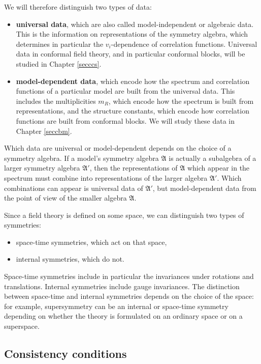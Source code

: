 \documentclass[12pt, a4paper, notitlepage, twoside]{report}
\numberwithin{equation}{section}
\theoremstyle{break}
\begin{document}
We will therefore distinguish two types of data:
\begin{itemize}
 \item \textbf{\boldmath universal data}, which are also called 
model-independent or algebraic data.
This is the information on representations of the symmetry algebra, which determines in particular the $v_i$-dependence of correlation functions.
Universal data in conformal field theory, and in particular conformal blocks, will be studied in Chapter \ref{secccs}. 
\item \textbf{\boldmath model-dependent data}, which encode how the spectrum and correlation functions of a particular model are built from the universal data.
This includes the multiplicities $m_R$, which encode how the spectrum is built from representations, and the structure constants, which encode how correlation functions are built from conformal blocks.
We will study these data 
in Chapter \ref{seccbm}.  
\end{itemize}
Which data are  universal or model-dependent depends on the choice of a symmetry algebra.
If a model's symmetry algebra $\mathfrak{A}$ is actually a subalgebra of a larger symmetry algebra $\mathfrak{A}'$, then the representations of $\mathfrak{A}$ which appear in the spectrum
must combine into representations of the larger algebra $\mathfrak{A}'$.
Which combinations can appear is universal data of $\mathfrak{A}'$, but model-dependent data from the point of view of the smaller algebra $\mathfrak{A}$. 

Since a field theory is defined on some space, we can distinguish two types of symmetries: 
\begin{itemize}
 \item space-time symmetries, which act on that space,
\item internal symmetries, which do not.
\end{itemize}
Space-time symmetries include in particular the invariances under rotations and translations.
Internal symmetries include gauge invariances.
The distinction between space-time and internal symmetries depends on the choice of the space: for example, supersymmetry can be an internal or space-time symmetry depending on whether the theory is formulated on an ordinary space or on a superspace.

\subsection{Consistency conditions \label{seccc}}
\end{document}
